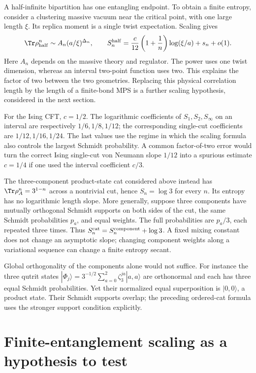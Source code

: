 A half-infinite bipartition has one entangling endpoint. To obtain
a finite entropy, consider a clustering massive vacuum near the
critical point, with one large length $\xi$. Its replica moment is a
single twist expectation. Scaling gives
\[
 \Tr\rho_{\rm half}^n
   \sim A_n(a/\xi)^{\Delta_n},\qquad
 S_n^{\rm half}
   =\frac c{12}\left(1+\frac1n\right)\log(\xi/a)+s_n+o(1).
\]
Here $A_n$ depends on the massive theory and regulator. The power uses
one twist dimension, whereas an interval two-point function uses two.
This explains the factor of two between the two geometries. Replacing
this physical correlation length by the length of a finite-bond MPS
is a further scaling hypothesis, considered in the next section.

\begin{example}
For the Ising CFT, $c=1/2$. The logarithmic coefficients of
$S_1,S_2,S_\infty$ on an interval are respectively
$1/6,1/8,1/12$; the corresponding single-cut coefficients are
$1/12,1/16,1/24$. The last values use the regime in which the
scaling formula also controls the largest Schmidt probability.
A common factor-of-two error would turn the correct Ising
single-cut von Neumann slope $1/12$ into a spurious estimate
$c=1/4$ if one used the interval coefficient $c/3$.

The three-component product-state cat considered above instead has
$\Tr\rho_A^n=3^{1-n}$ across a nontrivial cut, hence $S_n=\log3$
for every $n$. Its entropy has no logarithmic length slope. More
generally, suppose three components have mutually orthogonal Schmidt
supports on both sides of the cut, the same Schmidt probabilities
$p_a$, and equal weights. The full probabilities are
$p_a/3$, each repeated three times. Thus
$S_n^{\rm cat}=S_n^{\rm component}+\log3$. A fixed mixing constant
does not change an asymptotic slope; changing component weights
along a variational sequence can change a finite entropy secant.

Global orthogonality of the components alone would not suffice.
For instance the three qutrit states
$|\Phi_j\rangle=3^{-1/2}\sum_{a=0}^2\zeta_3^{ja}|a,a\rangle$
are orthonormal and each has three equal Schmidt probabilities.
Yet their normalized equal superposition is $|0,0\rangle$, a
product state. Their Schmidt supports overlap; the preceding
ordered-cat formula uses the stronger support condition explicitly.
\end{example}

\section{Finite-entanglement scaling as a hypothesis to test}

